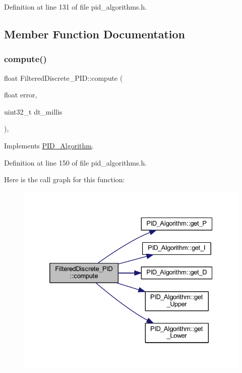 Definition at line 131 of file pid\+\_\+algorithms.\+h.



\subsection{Member Function Documentation}
\mbox{\label{class_filtered_discrete___p_i_d_abbfc49fd3eb46f14f02ef707412193e3}} 
\subsubsection{\texorpdfstring{compute()}{compute()}}
{\footnotesize\ttfamily float Filtered\+Discrete\+\_\+\+P\+I\+D\+::compute (\begin{DoxyParamCaption}\item[{float}]{error,  }\item[{uint32\+\_\+t}]{dt\+\_\+millis }\end{DoxyParamCaption})\hspace{0.3cm}{\ttfamily [inline]}, {\ttfamily [virtual]}}



Implements \mbox{\hyperlink{class_p_i_d___algorithm_a388ec97d23c981e62c3726505688e1f0}{P\+I\+D\+\_\+\+Algorithm}}.



Definition at line 150 of file pid\+\_\+algorithms.\+h.

Here is the call graph for this function\+:
\nopagebreak
\begin{figure}[H]
\begin{center}
\leavevmode
\includegraphics[width=332pt]{class_filtered_discrete___p_i_d_abbfc49fd3eb46f14f02ef707412193e3_cgraph}
\end{center}
\end{figure}
\mbox{\label{class_filtered_discrete___p_i_d_a25527ee5cdf564098de13dd362d475fc}} 
